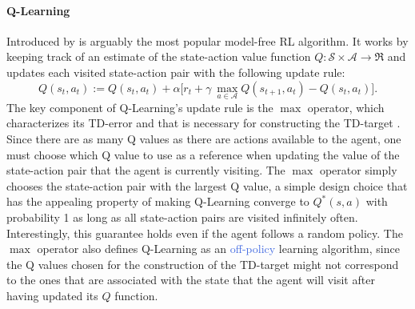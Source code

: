 \paragraph{\textbf{\uppercase{Q}-\uppercase{L}earning}} Introduced by \citet{watkins1992q} is arguably the most popular model-free RL algorithm. It works by keeping track of an estimate of the state-action value function $Q: \mathcal{S} \times \mathcal{A} \rightarrow \Re$ and updates each visited state-action pair with the following update rule:
\begin{equation}
Q(s_t,a_t):=Q(s_t,a_t) + \alpha\big[r_t + \gamma \:\underset{a\in \mathcal{A}}{\max} Q(s_{t+1},a_t) - Q(s_t, a_t) \big].
\label{eq:q_learning}
\end{equation}
The key component of Q-Learning's update rule is the $\max$ operator, which characterizes its TD-error and that is necessary for constructing the TD-target . Since there are as many Q values as there are actions available to the agent, one must choose which Q value to use as a reference when updating the value of the state-action pair that the agent is currently visiting. The $\max$ operator simply chooses the state-action pair with the largest Q value, a simple design choice that has the appealing property of making Q-Learning converge to $Q^{*}(s, a)$ with probability 1 as long as all state-action pairs are visited infinitely often. Interestingly, this guarantee holds even if the agent follows a random policy. The $\max$ operator also defines Q-Learning as an \textcolor{RoyalBlue}{off-policy} learning algorithm, since the Q values chosen for the construction of the TD-target might not correspond to the ones that are associated with the state that the agent will visit after having updated its $Q$ function.

